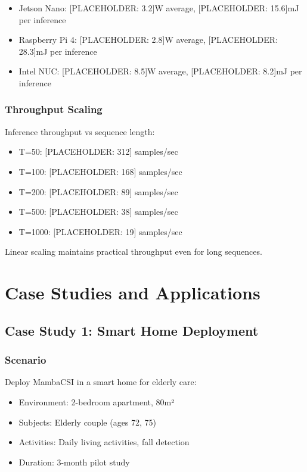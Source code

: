 \documentclass[journal]{IEEEtran}
\begin{document}
\begin{itemize}
\item Jetson Nano: [PLACEHOLDER: 3.2]W average, [PLACEHOLDER: 15.6]mJ per inference
\item Raspberry Pi 4: [PLACEHOLDER: 2.8]W average, [PLACEHOLDER: 28.3]mJ per inference
\item Intel NUC: [PLACEHOLDER: 8.5]W average, [PLACEHOLDER: 8.2]mJ per inference
\end{itemize}

\subsubsection{Throughput Scaling}
Inference throughput vs sequence length:

\begin{itemize}
\item T=50: [PLACEHOLDER: 312] samples/sec
\item T=100: [PLACEHOLDER: 168] samples/sec
\item T=200: [PLACEHOLDER: 89] samples/sec
\item T=500: [PLACEHOLDER: 38] samples/sec
\item T=1000: [PLACEHOLDER: 19] samples/sec
\end{itemize}

Linear scaling maintains practical throughput even for long sequences.

\section{Case Studies and Applications}

\subsection{Case Study 1: Smart Home Deployment}

\subsubsection{Scenario}
Deploy MambaCSI in a smart home for elderly care:
\begin{itemize}
\item Environment: 2-bedroom apartment, 80m²
\item Subjects: Elderly couple (ages 72, 75)
\item Activities: Daily living activities, fall detection
\item Duration: 3-month pilot study
\end{itemize}
\end{document}

